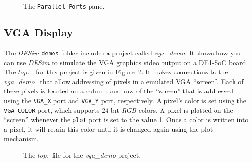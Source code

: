 {\begin{figure}[h]
	\begin{center}
        \setlength{\fboxsep}{0pt}
	\end{center}
          \caption{The \texttt{Parallel Ports} pane.}
	\label{fig:gpio_pane}
\end{figure}

\subsection{VGA Display}

The {\it DESim} \texttt{demos} folder includes a project called {\it vga\_demo}. It shows how 
you can use {\it DESim} to simulate the VGA graphics video output on a DE1-SoC board.
The {\it top.\hdlFileExt}~\hdlModuleName~for this project is given in Figure~\ref{fig:vga}. It makes
connections to the {\it vga\_demo} \hdlModuleName~that allow addressing of pixels in a
emulated VGA ``screen''. Each of these pixels is located on a column and row of the 
``screen'' that is addressed using the \texttt{VGA\_X} port and \texttt{VGA\_Y} port,
respectively. A pixel's color is set using the \texttt{VGA\_COLOR} port, which supports
24-bit {\it RGB} colors.  A pixel is plotted on the ``screen'' whenever the 
\texttt{plot} port is set to the value 1. Once a color is written into a pixel, it will
retain this color until it is changed again using the plot mechanism.

\begin{figure}[h]
\begin{center}
\begin{minipage}[h]{17.5 cm}
\ifverilog
    \ifnotSV
        
    \else
        
    \fi
\else
	
\fi
\end{minipage}
	\caption{The {\it top.\hdlFileExt}~file for the {\it vga\_demo} project.}
	\label{fig:vga}
\end{center}
\end{figure}

}
